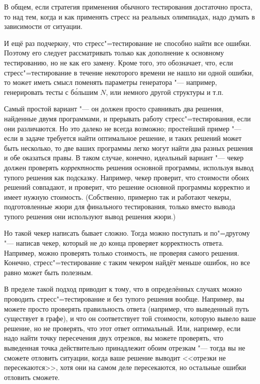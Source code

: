 \documentclass[a4paper,10pt]{problems}
\begin{document}
В общем, если стратегия применения обычного тестирования достаточно проста, то над тем, когда и как применять стресс на реальных олимпиадах,
надо думать в зависимости от ситуации.

И ещё раз подчеркну, что стресс"=тестирование не способно найти все ошибки. 
Поэтому его следует рассматривать только как дополнение к основному тестированию, но не как его замену.
Кроме того, это обозначает, что, если стресс"=тестирование в течение некоторого времени не нашло ни одной ошибки,
то может иметь смысл поменять параметры генератора "--- например, генерировать тесты с б\'{о}льшим $N$, или немного другой структуры и т.п.

Самый простой вариант "--- он должен просто сравнивать два решения, найденные двумя программами, и прерывать работу стресс"=тестирования,
если они различаются.
Но это далеко не всегда возможно; простейший пример "--- если в задаче требуется найти оптимальное решение, и таких решений может быть несколько,
то две ваших программы легко могут найти два разных решения и обе оказаться правы.
В таком случае, конечно, идеальный вариант "--- чекер должен проверять \textit{корректность} решения основной программы, 
используя вывод тупого решения как подсказку. 
Например, чекер проверит, что стоимости обоих решений совпадают, и проверит, что решение основной программы корректно и имеет нужную стоимость.
(Собственно, примерно так и работают чекеры, подготовленные жюри для финального тестирования, только вместо вывода тупого решения они используют
вывод решения жюри.)

Но такой чекер написать бывает сложно. Тогда можно поступать и по"=другому "--- написав чекер, который не до конца проверяет корректность ответа.
Например, можно проверять только стоимость, не проверяя самого решения.
Конечно, стресс"=тестирование с таким чекером найдёт меньше ошибок, но все равно может быть полезным.

В пределе такой подход приводит к тому, что в определённых случаях можно проводить стресс"=тестирование и без тупого решения вообще.
Например, вы можете просто проверять правильность ответа (например, что выведенный путь существует в графе), и что он соответствует той стоимости,
которую вывело ваше решение, но не проверять, что этот ответ оптимальный. 
Или, например, если надо найти точку пересечения двух отрезков, вы можете проверять, что выведенная точка действительно принадлежит
обоим отрезкам "--- тогда вы не сможете отловить ситуации, когда ваше решение выводит <<отрезки не пересекаются>>, хотя они на самом деле пересекаются,
но остальные ошибки отловить сможете.
\end{document}

